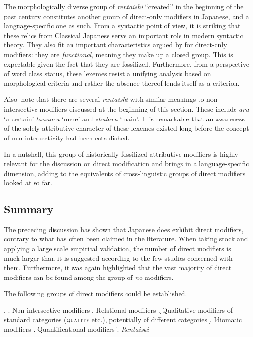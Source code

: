 \documentclass [output=book,colorlinks,citecolor=brown]{langscibook}
\begin{document}
The morphologically diverse group of \textit{rentaishi} ``created'' in the beginning of the past century constitutes another group of direct-only modifiers in Japanese, and a language-specific one as such. From a syntactic point of view, it is striking that these relics from Classical Japanese serve an important role in modern syntactic theory. They also fit an important characteristics argued by \citet{cinque:2010:adj} for direct-only modifiers: they are \textit{functional}, meaning they make up a closed group. This is expectable given the fact that they are fossilized. Furthermore, from a perspective of word class status, these lexemes resist a unifying analysis based on morphological criteria and rather the absence thereof lends itself as a criterion. %

Also, note that there are several \textit{rentaishi} with similar meanings to non-intersective modifiers \citep{kamp:1995:prototype, panayidou:2013:in} discussed at the beginning of this section. These include \textit{aru} `a certain’ \textit{tannaru} `mere’ and \textit{shutaru} `main’. It is remarkable that an awareness of the solely attributive character of these lexemes existed long before the concept of non-intersectivity had been established.

In a nutshell, this group of historically fossilized attributive modifiers is highly relevant for the discussion on direct modification and brings in a language-specific dimension, adding to the equivalents of cross-linguistic groups of direct modifiers looked at so far.

\subsection{Summary}

The preceding discussion has shown that Japanese does exhibit direct modifiers, contrary to what has often been claimed in the literature. When taking stock and applying a large scale empirical validation, the number of direct modifiers is much larger than it is suggested according to the few studies concerned with them. Furthermore, it was again highlighted that the vast majority of direct modifiers can be found among the group of \textit{no}-modifiers.

The following groups of direct modifiers could be established.

\ex. \a. Non-intersective modifiers
\b. Relational modifiers
\c. Qualitative modifiers of standard categories (\textsc{quality} etc.), potentially of different categories
\d. Idiomatic modifiers
\e. Quantificational modifiers
\f. \textit{Rentaishi}
\end{document}

